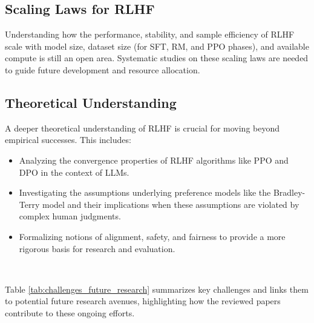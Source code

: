 \documentclass{article} %
\begin{document}
\subsection{Scaling Laws for RLHF}
Understanding how the performance, stability, and sample efficiency of RLHF scale with model size, dataset size (for SFT, RM, and PPO phases), and available compute is still an open area. Systematic studies on these scaling laws are needed to guide future development and resource allocation.  

\subsection{Theoretical Understanding}
A deeper theoretical understanding of RLHF is crucial for moving beyond empirical successes. This includes:
\begin{itemize}
\item Analyzing the convergence properties of RLHF algorithms like PPO and DPO in the context of LLMs.
\item Investigating the assumptions underlying preference models like the Bradley-Terry model and their implications when these assumptions are violated by complex human judgments.
\item Formalizing notions of alignment, safety, and fairness to provide a more rigorous basis for research and evaluation.
\end{itemize}  

Table \ref{tab:challenges_future_research} summarizes key challenges and links them to potential future research avenues, highlighting how the reviewed papers contribute to these ongoing efforts.
\end{document}
